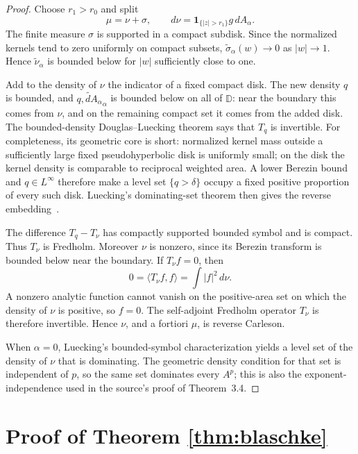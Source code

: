 \documentclass[11pt]{article}
\newcommand{\D}{\mathbb D}
\begin{document}
\begin{proof}
Choose $r_1>r_0$ and split
\[
 \mu=\nu+\sigma,
 \qquad d\nu=\mathbf1_{\{|z|>r_1\}}g\,dA_\alpha.
\]
The finite measure $\sigma$ is supported in a compact subdisk.  Since the
normalized kernels tend to zero uniformly on compact subsets,
$\widetilde\sigma_\alpha(w)\to0$ as $|w|\to1$.  Hence
$\widetilde\nu_\alpha$ is bounded below for $|w|$ sufficiently close to one.

Add to the density of $\nu$ the indicator of a fixed compact disk.  The new
density $q$ is bounded, and $\widetilde{q,dA_\alpha}_\alpha$ is bounded below
on all of $\D$: near the boundary this comes from $\nu$, and on the remaining
compact set it comes from the added disk.  The bounded-density
Douglas--Luecking theorem says that $T_q$ is invertible.  For completeness,
its geometric core is short: normalized kernel mass outside a sufficiently
large fixed pseudohyperbolic disk is uniformly small; on the disk the kernel
density is comparable to reciprocal weighted area.  A lower Berezin bound
and $q\in L^\infty$ therefore make a level set $\{q>\delta\}$ occupy a fixed
positive proportion of every such disk.  Luecking's dominating-set theorem
then gives the reverse embedding~\cite{L81,L84,CLZ}.

The difference $T_q-T_\nu$ has compactly supported bounded symbol and is
compact.  Thus $T_\nu$ is Fredholm.  Moreover $\nu$ is nonzero, since its
Berezin transform is bounded below near the boundary.  If $T_\nu f=0$, then
\[
 0=\langle T_\nu f,f\rangle
   =\int |f|^2\,d\nu.
\]
A nonzero analytic function cannot vanish on the positive-area set on which
the density of $\nu$ is positive, so $f=0$.  The self-adjoint Fredholm
operator $T_\nu$ is therefore invertible.  Hence $\nu$, and a fortiori
$\mu$, is reverse Carleson.

When $\alpha=0$, Luecking's bounded-symbol characterization yields a level
set of the density of $\nu$ that is dominating.  The geometric density
condition for that set is independent of $p$, so the same set dominates
every $A^p$; this is also the exponent-independence used in the source's
proof of Theorem~3.4.
\end{proof}

\section{Proof of Theorem \ref{thm:blaschke}}
\end{document}

